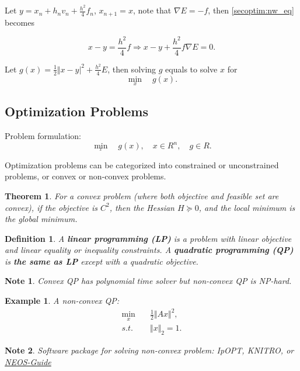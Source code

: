 \documentclass{fancydoc}
\newtheorem{mydef}{Definition}
\newtheorem{thm}{Theorem}
\newtheorem{note}{Note}
\newtheorem{ex}{Example}
\begin{document}
Let $y = x_n + h_nv_n + \frac{h^2}{4}f_n$, $x_{n+1} = x$, note that $\nabla E = -f$, then \eqref{secoptim:nw_eq} becomes

\begin{equation}
x - y = \frac{h^2}{4}f \Rightarrow x - y + \frac{h^2}{4}f\nabla E = 0.
\end{equation}

Let $g(x) = \frac{1}{2}\Vert x-y\vert^2 + \frac{h^2}{4}E$, then solving $g$ equals to solve $x$ for
\begin{equation}
\min_{x} \quad g(x).
\end{equation}

\subsection{Optimization Problems}
Problem formulation:
\begin{equation}\label{problem_optim_nonlinear}
\min_{_x} \quad g(x), \quad x\in \!R^n, \quad g\in \!R.
\end{equation}

Optimization problems can be categorized into constrained or unconstrained problems, or convex or non-convex problems. 

\begin{thm}
	For a convex problem (where both objective and feasible set are convex), if the objective is $\!C^2$, then the Hessian $H \succeq 0$, and the local minimum is the global minimum.
\end{thm}

\begin{mydef}
	A \textbf{linear programming (LP)} is a problem with linear objective and linear equality or inequality constraints. A \textbf{quadratic programming (QP)} is {\bf the same as LP} except with a quadratic objective.
\end{mydef}

\begin{note}
	Convex QP has polynomial time solver but non-convex QP is NP-hard.
\end{note}
\begin{ex}
	A non-convex QP: 
	\begin{subequations}
		\begin{align}
		\min_{x} \quad&\frac{1}{2} \Vert Ax \Vert^2, \\
		s.t. \quad & \Vert x \Vert_2 = 1.
		\end{align}
	\end{subequations}
\end{ex}
\begin{note}
	Software package for solving non-convex problem: {\rm IpOPT}, {\rm KNITRO}, or \href{https://neos-guide.org/}{NEOS-Guide} 
\end{note}
\end{document}
